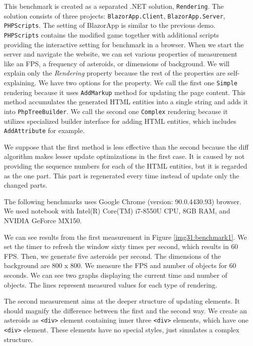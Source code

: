 \par
This benchmark is created as a separated .NET solution, \texttt{Rendering}.
The solution consists of three projects: \texttt{BlazorApp.Client}, \texttt{BlazorApp.Server}, \texttt{PHPScripts}.
The setting of BlazorApp is similar to the previous demo.
\texttt{PHPScripts} contains the modified game together with additional scripts providing the interactive setting for benchmark in a browser.
When we start the server and navigate the website, we can set various properties of measurement like an FPS, a frequency of asteroids, or dimensions of background.
We will explain only the \textit{Rendering} property because the rest of the properties are self-explaining.
We have two options for the property.
We call the first one \texttt{Simple} rendering because it uses \texttt{AddMarkup} method for updating the page content.
This method accumulates the generated HTML entities into a single string and adds it into \texttt{PhpTreeBuilder}.
We call the second one \texttt{Complex} rendering because it utilizes specialized builder interface for adding HTML entities, which includes \texttt{AddAttribute} for example.
\par
We suppose that the first method is less effective than the second because the diff algorithm makes lesser update optimizations in the first case.
It is caused by not providing the sequence numbers for each of the HTML entities, but it is regarded as the one part.
This part is regenerated every time instead of update only the changed parts.
\par
The following benchmarks uses Google Chrome (version: 90.0.4430.93) browser.
We used notebook with Intel(R) Core(TM) i7-8550U CPU, 8GB RAM, and NVIDIA GeForce MX150.
\par
We can see results from the first measurement in Figure \ref{img31:benchmark1}.
We set the timer to refresh the window sixty times per second, which results in 60 FPS.
Then, we generate five asteroids per second.
The dimensions of the background are 800 x 800.
We measure the FPS and number of objects for 60 seconds.
We can see two graphs displaying the current time and number of objects.
The lines represent measured values for each type of rendering.
\par
The second measurement aims at the deeper structure of updating elements. 
It should magnify the difference between the first and the second way.
We create an asteroids as \texttt{<div>} element containing inner three \texttt{<div>} elements, which have one \texttt{<div>} element.
These elements have no special styles, just simulates a complex structure.
